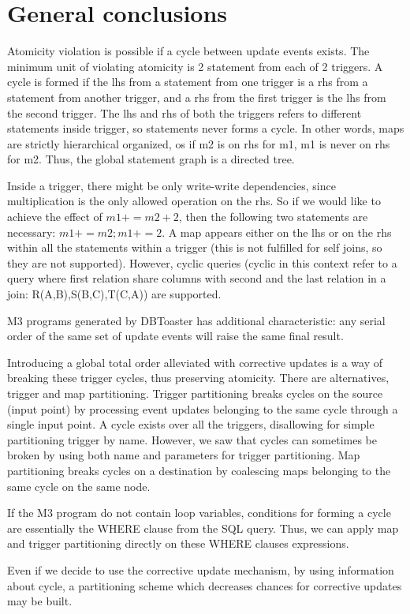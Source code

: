 \documentclass{sig-semester}
\begin{document}
\section{General conclusions}
\vspace{2mm}
Atomicity violation is possible if a cycle between update events exists. The minimum unit of violating atomicity is 2 statement from each of 2 triggers. A cycle is formed if the lhs from a statement from one trigger is a rhs from a statement from another trigger, and a rhs from the first trigger is the lhs from the second trigger. The lhs and rhs of both the triggers refers to different statements inside trigger, so statements never forms a cycle. In other words, maps are strictly hierarchical organized, os if m2 is on rhs for m1, m1 is never on rhs for m2. Thus, the global statement graph is a directed tree.

Inside a trigger, there might be only write-write dependencies, since multiplication is the only allowed operation on the rhs. So if we would like to achieve the effect of $m1+=m2+2$, then the following two statements are necessary: $m1+=m2; m1+=2$. A map appears either on the lhs or on the rhs within all the statements within a trigger (this is not fulfilled for self joins, so they are not supported). However, cyclic queries (cyclic in this context refer to a query where first relation share columns with second and the last relation in a join: R(A,B),S(B,C),T(C,A)) are supported.

M3 programs generated by DBToaster has additional characteristic: any serial order of the same set of update events will raise the same final result.

Introducing a global total order alleviated with corrective updates is a way of breaking these trigger cycles, thus preserving atomicity. There are alternatives, trigger and map partitioning. Trigger partitioning breaks cycles on the source (input point) by processing event updates belonging to the same cycle through a single input point. A cycle exists over all the triggers, disallowing for simple partitioning trigger by name. However, we saw that cycles can sometimes be broken by using both name and parameters for trigger partitioning. Map partitioning breaks cycles on a destination by coalescing maps belonging to the same cycle on the same node.

If the M3 program do not contain loop variables, conditions for forming a cycle are essentially the WHERE clause from the SQL query. Thus, we can apply map and trigger partitioning directly on these WHERE clauses expressions.

Even if we decide to use the corrective update mechanism, by using information about cycle, a partitioning scheme which decreases chances for corrective updates may be built.

%
%

\newpage
\end{document}
